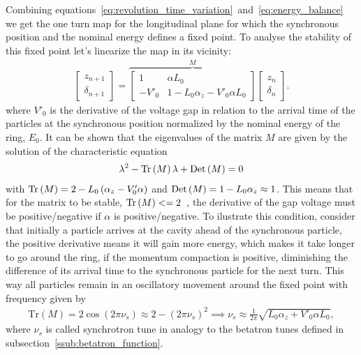 	Combining equations~\eqref{eq:revolution_time_variation}~and~\eqref{eq:energy_balance} we get the one turn map for the longitudinal plane for which the synchronous position and the nominal energy defines a fixed point. To analyse the stability of this fixed point let's linearize the map in its vicinity:
	\begin{align}\label{eq:longitudinal_linear_map}
		\begin{bmatrix} z_{n+1} \\ \delta_{n+1}\end{bmatrix} = \overbrace{
			\begin{bmatrix}
                1 & \alpha L_0 \\
                -V'_0 & 1-L_0\alpha_z - V'_0\alpha L_0
            \end{bmatrix}
		}^M \begin{bmatrix} z_n \\ \delta_n \end{bmatrix}.
	\end{align}
	where $V'_0$ is the derivative of the voltage gap in relation to the arrival time of the particles at the synchronous position normalized by the nominal energy of the ring, $E_0$. It can be shown that the eigenvalues of the matrix $M$ are given by the solution of the characteristic equation
    \begin{align}
        \lambda^2 - \text{Tr}\left(M\right)\lambda + \text{Det}\left(M\right) = 0
    \end{align}
    with $\text{Tr}\left(M\right) = 2-L_0\left(\alpha_z-V'_0\alpha\right)$ and $\text{Det}\left(M\right) = 1-L_0\alpha_z\approx 1$. This means that for the matrix to be stable, $\text{Tr}\left(M\right) <= 2$~\cite{Courant1958}, the derivative of the gap voltage must be positive/negative if $\alpha$ is positive/negative. To ilustrate this condition, consider that initially a particle arrives at the cavity ahead of the synchronous particle, the positive derivative means it will gain more energy, which makes it take longer to go around the ring, if the momentum compaction is positive, diminishing the difference of its arrival time to the synchronous particle for the next turn. This way all particles remain in an oscillatory movement around the fixed point with frequency given by
	\begin{align}
		\text{Tr}(M) = 2\cos(2\pi\nu_s) \approx 2-(2\pi\nu_s)^2 \implies
		\nu_s \approx \frac{1}{2\pi}\sqrt{L_0\alpha_z+V'_0\alpha L_0},
	\end{align}
	where $\nu_s$ is called synchrotron tune in analogy to the betatron tunes defined in subsection~\ref{ssub:betatron_function}.

